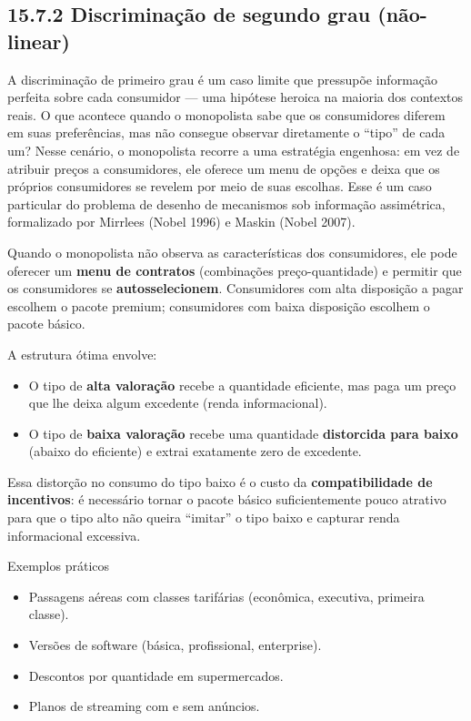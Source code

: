 \documentclass[11pt,twoside,openright]{book}
\providecommand{\tightlist}{\setlength{\itemsep}{0pt}\setlength{\parskip}{0pt}}
\begin{document}
\subsection{15.7.2 Discriminação de segundo grau
(não-linear)}\label{discriminauxe7uxe3o-de-segundo-grau-nuxe3o-linear}

A discriminação de primeiro grau é um caso limite que pressupõe
informação perfeita sobre cada consumidor --- uma hipótese heroica na
maioria dos contextos reais. O que acontece quando o monopolista sabe
que os consumidores diferem em suas preferências, mas não consegue
observar diretamente o ``tipo'' de cada um? Nesse cenário, o monopolista
recorre a uma estratégia engenhosa: em vez de atribuir preços a
consumidores, ele oferece um menu de opções e deixa que os próprios
consumidores se revelem por meio de suas escolhas. Esse é um caso
particular do problema de desenho de mecanismos sob informação
assimétrica, formalizado por Mirrlees (Nobel 1996) e Maskin (Nobel
2007).

Quando o monopolista não observa as características dos consumidores,
ele pode oferecer um \textbf{menu de contratos} (combinações
preço-quantidade) e permitir que os consumidores se
\textbf{autosselecionem}. Consumidores com alta disposição a pagar
escolhem o pacote premium; consumidores com baixa disposição escolhem o
pacote básico.

A estrutura ótima envolve:

\begin{itemize}
\tightlist
\item
  O tipo de \textbf{alta valoração} recebe a quantidade eficiente, mas
  paga um preço que lhe deixa algum excedente (renda informacional).
\item
  O tipo de \textbf{baixa valoração} recebe uma quantidade
  \textbf{distorcida para baixo} (abaixo do eficiente) e extrai
  exatamente zero de excedente.
\end{itemize}

Essa distorção no consumo do tipo baixo é o custo da
\textbf{compatibilidade de incentivos}: é necessário tornar o pacote
básico suficientemente pouco atrativo para que o tipo alto não queira
``imitar'' o tipo baixo e capturar renda informacional excessiva.

\begin{tipbox}{Exemplos práticos}

\begin{itemize}
\tightlist
\item
  Passagens aéreas com classes tarifárias (econômica, executiva,
  primeira classe).
\item
  Versões de software (básica, profissional, enterprise).
\item
  Descontos por quantidade em supermercados.
\item
  Planos de streaming com e sem anúncios.
\end{itemize}

\end{tipbox}
\end{document}
